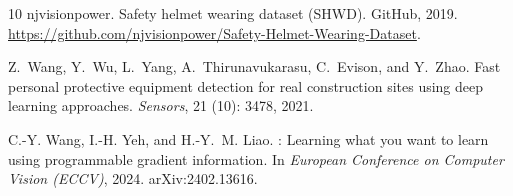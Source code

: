\documentclass{article}
\begin{document}
\begin{thebibliography}{10}
{njvisionpower}.
\newblock Safety helmet wearing dataset ({SHWD}).
\newblock GitHub, 2019.
\newblock \url{https://github.com/njvisionpower/Safety-Helmet-Wearing-Dataset}.

Z.~Wang, Y.~Wu, L.~Yang, A.~Thirunavukarasu, C.~Evison, and Y.~Zhao.
\newblock Fast personal protective equipment detection for real construction
  sites using deep learning approaches.
\newblock \emph{Sensors}, 21 (10): 3478, 2021.

C.-Y. Wang, I.-H. Yeh, and H.-Y.~M. Liao.
: Learning what you want to learn using programmable gradient
  information.
\newblock In \emph{European Conference on Computer Vision (ECCV)}, 2024.
\newblock arXiv:2402.13616.

\end{thebibliography}
\end{document}
